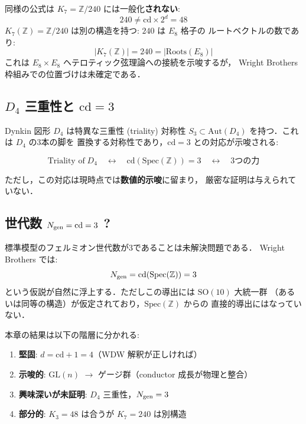 \documentclass[11pt,a4paper]{article}
\begin{document}
\begin{warningbox}[$K_7$ の問題]
同様の公式は $K_7 = \mathbb{Z}/240$ には一般化\textbf{されない}:
\begin{equation}
240 \neq \mathrm{cd} \times 2^d = 48
\end{equation}
$K_7(\mathbb{Z}) = \mathbb{Z}/240$ は別の構造を持つ: $240$ は $E_8$ 格子の
ルートベクトルの数であり:
\begin{equation}
|K_7(\mathbb{Z})| = 240 = |\text{Roots}(E_8)|
\end{equation}
これは $E_8 \times E_8$ ヘテロティック弦理論への接続を示唆するが，
Wright Brothers 枠組みでの位置づけは未確定である．
\end{warningbox}

\subsection{$D_4$ 三重性と $\mathrm{cd}=3$}

Dynkin 図形 $D_4$ は特異な三重性 (triality) 対称性
$S_3 \subset \mathrm{Aut}(D_4)$ を持つ．これは $D_4$ の3本の脚を
置換する対称性であり，$\mathrm{cd} = 3$ との対応が示唆される:

\begin{equation}
\text{Triality of}\;D_4
\quad\longleftrightarrow\quad
\mathrm{cd}(\mathrm{Spec}(\mathbb{Z})) = 3
\quad\longleftrightarrow\quad
\text{3つの力}
\end{equation}

ただし，この対応は現時点では\textbf{数値的示唆}に留まり，
厳密な証明は与えられていない．

\subsection{世代数 $N_{\rm gen} = \mathrm{cd} = 3$ ?}

標準模型のフェルミオン世代数が3であることは未解決問題である．
Wright Brothers では:
\begin{equation}
N_{\rm gen} = \mathrm{cd}(\mathrm{Spec}(\mathbb{Z})) = 3
\end{equation}
という仮説が自然に浮上する．ただしこの導出には $\mathrm{SO}(10)$ 大統一群
（あるいは同等の構造）が仮定されており，$\mathrm{Spec}(\mathbb{Z})$ からの
直接的導出にはなっていない．

\begin{warningbox}[正直な評価]
本章の結果は以下の階層に分かれる:
\begin{enumerate}
\item \textbf{堅固}: $d = \mathrm{cd} + 1 = 4$（WDW 解釈が正しければ）
\item \textbf{示唆的}: $\mathrm{GL}(n)$ $\to$ ゲージ群（conductor 成長が物理と整合）
\item \textbf{興味深いが未証明}: $D_4$ 三重性，$N_{\rm gen} = 3$
\item \textbf{部分的}: $K_3 = 48$ は合うが $K_7 = 240$ は別構造
\end{enumerate}
\end{warningbox}
\end{document}
